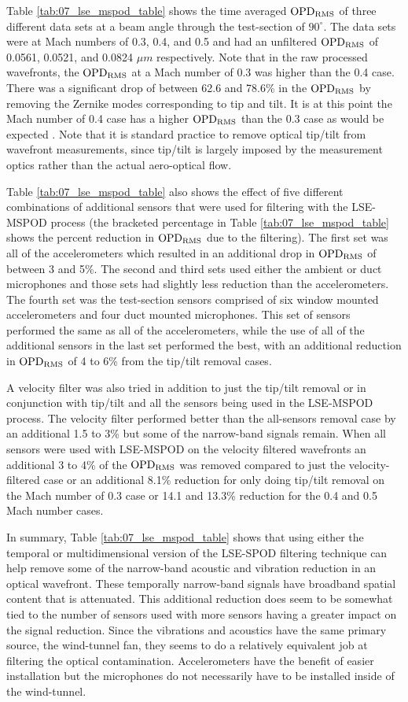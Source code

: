 Table \ref{tab:07_lse_mspod_table} shows the time averaged $\operatorname{OPD_{RMS}}$ of three different data sets at a beam angle through the test-section of $90^\circ$.
The data sets were at Mach numbers of 0.3, 0.4, and 0.5 and had an unfiltered $\operatorname{OPD_{RMS}}$ of 0.0561, 0.0521, and 0.0824 $\mu m$ respectively.
Note that in the raw processed wavefronts, the $\operatorname{OPD_{RMS}}$ at a Mach number of 0.3 was higher than the 0.4 case.
There was a significant drop of between 62.6 and 78.6\% in the $\operatorname{OPD_{RMS}}$ by removing the Zernike modes corresponding to tip and tilt.
It is at this point the Mach number of 0.4 case has a higher $\operatorname{OPD_{RMS}}$ than the 0.3 case as would be expected \cite{Gordeyev-2014-jcJndkHM}.
Note that it is standard practice to remove optical tip/tilt from wavefront measurements, since tip/tilt is largely imposed by the measurement optics rather than the actual aero-optical flow.

Table \ref{tab:07_lse_mspod_table} also shows the effect of five different combinations of additional sensors that were used for filtering with the LSE-MSPOD process (the bracketed percentage in Table \ref{tab:07_lse_mspod_table} shows the percent reduction in $\operatorname{OPD_{RMS}}$ due to the filtering).
The first set was all of the accelerometers which resulted in an additional drop in $\operatorname{OPD_{RMS}}$ of between 3 and 5\%.
The second and third sets used either the ambient or duct microphones and those sets had slightly less reduction than the accelerometers.
The fourth set was the test-section sensors comprised of six window mounted accelerometers and four duct mounted microphones.
This set of sensors performed the same as all of the accelerometers, while the use of all of the additional sensors in the last set performed the best, with an additional reduction in $\operatorname{OPD_{RMS}}$ of 4 to 6\% from the tip/tilt removal cases.

A velocity filter was also tried in addition to just the tip/tilt removal or in conjunction with tip/tilt and all the sensors being used in the LSE-MSPOD process.
The velocity filter performed better than the all-sensors removal case by an additional 1.5 to 3\% but some of the narrow-band signals remain.
When all sensors were used with LSE-MSPOD on the velocity filtered wavefronts an additional 3 to 4\% of the $\operatorname{OPD_{RMS}}$ was removed compared to just the velocity-filtered case or an additional 8.1\% reduction for only doing tip/tilt removal on the Mach number of 0.3 case or 14.1 and 13.3\% reduction for the 0.4 and 0.5 Mach number cases.

In summary, Table \ref{tab:07_lse_mspod_table} shows that using either the temporal or multidimensional version of the LSE-SPOD filtering technique can help remove some of the narrow-band acoustic and vibration reduction in an optical wavefront.
These temporally narrow-band signals have broadband spatial content that is attenuated.
This additional reduction does seem to be somewhat tied to the number of sensors used with more sensors having a greater impact on the signal reduction.
Since the vibrations and acoustics have the same primary source, the wind-tunnel fan, they seems to do a relatively equivalent job at filtering the optical contamination.
Accelerometers have the benefit of easier installation but the microphones do not necessarily have to be installed inside of the wind-tunnel.
